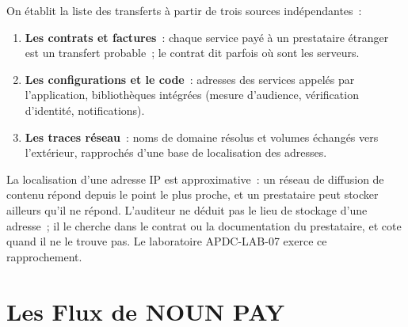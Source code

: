 On établit la liste des transferts à partir de trois sources
indépendantes~:

\begin{enumerate}
    \item \textbf{Les contrats et factures}~: chaque service payé à un
          prestataire étranger est un transfert probable~; le contrat dit
          parfois où sont les serveurs.
    \item \textbf{Les configurations et le code}~: adresses des services
          appelés par l'application, bibliothèques intégrées (mesure
          d'audience, vérification d'identité, notifications).
    \item \textbf{Les traces réseau}~: noms de domaine résolus et volumes
          échangés vers l'extérieur, rapprochés d'une base de localisation
          des adresses.
\end{enumerate}

La localisation d'une adresse IP est approximative~: un réseau de diffusion
de contenu répond depuis le point le plus proche, et un prestataire peut
stocker ailleurs qu'il ne répond. L'auditeur ne déduit pas le lieu de
stockage d'une adresse~; il le cherche dans le contrat ou la documentation
du prestataire, et cote \NEK{} quand il ne le trouve pas. Le laboratoire
APDC-LAB-07 exerce ce rapprochement.

\section{Les Flux de NOUN PAY}
\label{sec:c11-nounpay}


